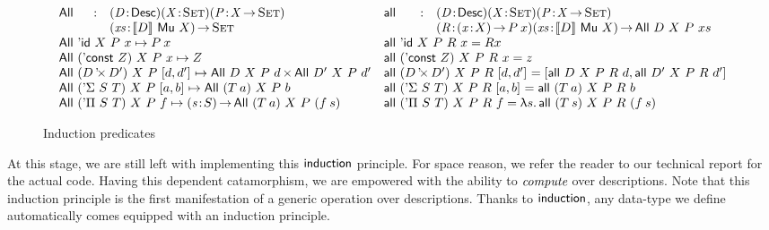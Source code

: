 \begin{figure*}

\[
\begin{array}{ll}
\stk{
\begin{array}{@{}ll}
\All{}{}{}{} : & \PITEL{\V{D}}{\Desc}
                 \PITEL{\V{X}}{\Set}
                 \PITEL{\V{P}}{\V{X} \To \Set} \\
               & \PI{\V{xs}}{\descop{D}{\Mu{X}}} 
                 \Set 
\end{array} \\
\All{\DId}{X}{P}{x} \mapsto P\: x \\
\All{(\DConst{Z})}{X}{P}{x} \mapsto Z \\
\All{(\DProd{D}{D'})}{X}{P}{\pair{d}{d'}{}} \mapsto \TIMES{\All{D}{X}{P}{d}}{\All{D'}{X}{P}{d'}} \\
\All{(\DSigma{S}{T})}{X}{P}{\pair{a}{b}{}} \mapsto \All{(T\: a)}{X}{P}{b} \\
\All{(\DPi{S}{T})}{X}{P}{f} \mapsto \PI{\V{s}}{S} \All{(T\: a)}{X}{P}{(f\: s)}
}
&
\stk{
\begin{array}{@{}ll}
\all{}{}{}{}{} : & \PITEL{\V{D}}{\Desc}
                   \PITEL{\V{X}}{\Set}
                   \PITEL{\V{P}}{\V{X} \To \Set} \\
                 & \PITEL{\V{R}}{\PI{\V{x}}{X} P\: x}
                   \PI{\V{xs}}{\descop{D}{\Mu{X}}} 
                   \All{D}{X}{P}{xs} 
\end{array} \\
\all{\DId}{X}{P}{R}{x} = R x \\
\all{(\DConst{Z})}{X}{P}{R}{x} = z \\
\all{(\DProd{D}{D'})}{X}{P}{R}{\pair{d}{d'}{}} = \pair{\all{D}{X}{P}{R}{d}}{\all{D'}{X}{P}{R}{d'}}{} \\
\all{(\DSigma{S}{T})}{X}{P}{R}{\pair{a}{b}{}} = \all{(T\: a)}{X}{P}{R}{b} \\
\all{(\DPi{S}{T})}{X}{P}{R}{f} = \LAM{s} \all{(T\: s)}{X}{P}{R}{(f\: s)}
\end{array}
}
\]

\caption{Induction predicates}
\label{fig:all-predicates}

\end{figure*}

At this stage, we are still left with implementing this
$\F{induction}$ principle. For space reason, we refer the reader to
our technical report for the actual code. Having this dependent
catamorphism, we are empowered with the ability to $\emph{compute}$
over descriptions. Note that this induction principle is the first
manifestation of a generic operation over descriptions. Thanks to
$\F{induction}$, any data-type we define automatically comes equipped
with an induction principle.


